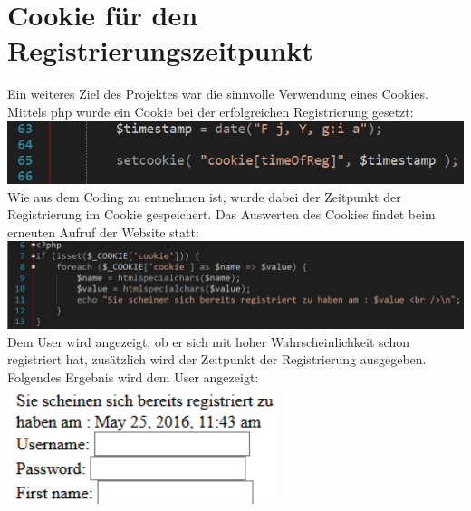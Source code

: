 \section{Cookie für den Registrierungszeitpunkt}
Ein weiteres Ziel des Projektes war die sinnvolle Verwendung eines Cookies. Mittels php wurde ein Cookie bei der erfolgreichen Registrierung gesetzt:
\newline
\includegraphics[width=1\textwidth]{img/vincent/abb18.png}
\newline
Wie aus dem Coding zu entnehmen ist, wurde dabei der Zeitpunkt der Registrierung im Cookie gespeichert. Das Auswerten des Cookies findet beim erneuten Aufruf der Website statt:
\newline
\includegraphics[width=1\textwidth]{img/vincent/abb19.png}
\newline
Dem User wird angezeigt, ob er sich mit hoher Wahrscheinlichkeit schon registriert hat, zus\"atzlich wird der Zeitpunkt der Registrierung ausgegeben. Folgendes Ergebnis wird dem User angezeigt:
\newline
\includegraphics[width=0.6\textwidth]{img/vincent/abb20.png}
\newline

